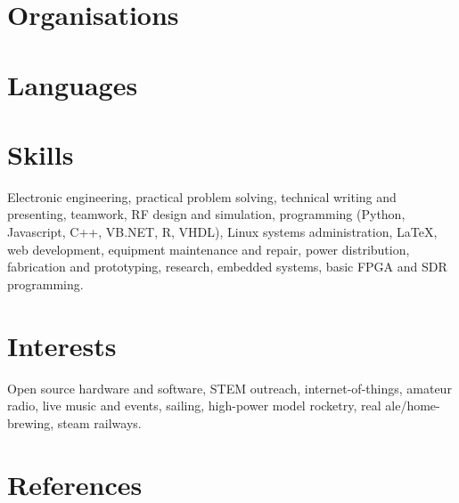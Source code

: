 \documentclass[11pt,a4paper,sans]{moderncv}        %
\begin{document}
\section{Organisations}

\section{Languages}

\section{Skills}
Electronic engineering, practical problem solving, technical writing and presenting, teamwork, RF design and simulation, programming (Python, Javascript, C++, VB.NET, R, VHDL), Linux systems administration, \LaTeX, web development, equipment maintenance and repair, power distribution, fabrication and prototyping, research, embedded systems, basic FPGA and SDR programming.

\section{Interests}
Open source hardware and software, STEM outreach, internet-of-things, amateur radio, live music and events, sailing, high-power model rocketry, real ale/home-brewing, steam railways.

\section{References}
\end{document}
